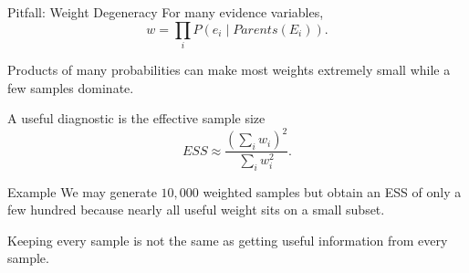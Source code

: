 \documentclass[aspectratio=169,10pt]{beamer}
\begin{document}
\begin{frame}[shrink=10]{Pitfall: Weight Degeneracy}
  For many evidence variables,
  \[
    w=\prod_i P(e_i\mid Parents(E_i)).
  \]

  Products of many probabilities can make most weights extremely small while a few samples dominate.

  A useful diagnostic is the effective sample size
  \[
    ESS\approx \frac{(\sum_i w_i)^2}{\sum_i w_i^2}.
  \]

  \begin{block}{Example}
    We may generate $10{,}000$ weighted samples but obtain an ESS of only a few hundred because nearly all useful weight sits on a small subset.
  \end{block}

  \begin{keyidea}
    Keeping every sample is not the same as getting useful information from every sample.
  \end{keyidea}
\end{frame}
\end{document}
